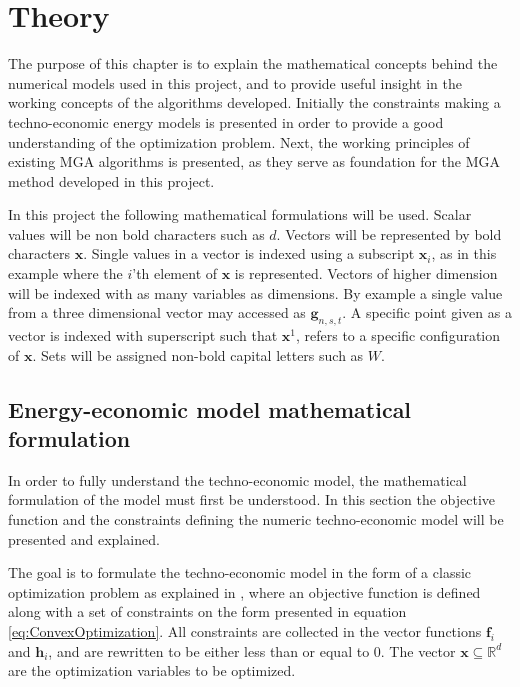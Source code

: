
\chapter{Theory}
The purpose of this chapter is to explain the mathematical concepts behind the numerical models used in this project, and to provide useful insight in the working concepts of the algorithms developed. Initially the constraints making a techno-economic energy models is presented in order to provide a good understanding of the optimization problem. Next, the working principles of existing MGA algorithms is presented, as they serve as foundation for the MGA method developed in this project. 

In this project the following mathematical formulations will be used. Scalar values will be non bold characters such as $d$. Vectors will be represented by bold characters $ \mathbf{x} $. Single values in a vector is indexed using a subscript $ \mathbf{x}_i $, as in this example where the $i$'th element of $\mathbf{x}$ is represented. Vectors of higher dimension will be indexed with as many variables as dimensions. By example a single value from a three dimensional vector may accessed as $\mathbf{g}_{n,s,t}$. A specific point given as a vector is indexed with superscript such that  $\mathbf{x}^1$, refers to a specific configuration of $\mathbf{x}$. Sets will be assigned non-bold capital letters such as $W$. 

\section{Energy-economic model mathematical formulation}\label{sec:OptimizationProblem}

In order to fully understand the techno-economic model, the mathematical formulation of the model must first be understood. In this section the objective function and the constraints defining the numeric techno-economic model will be presented and explained. 

The goal is to formulate the techno-economic model in the form of a classic optimization problem as explained in \cite{ConvexOpimization}, where an objective function is defined along with a set of constraints on the form presented in equation \ref{eq:ConvexOptimization}. All constraints are collected in the vector functions  $\mathbf{f}_i$ and $\mathbf{h}_i$, and are rewritten to be either less than or equal to $0$. The vector $\mathbf{x} \subseteq \mathbb{R}^d$ are the optimization variables to be optimized. 

